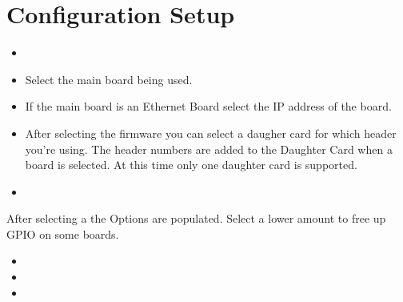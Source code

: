\documentclass[letterpaper,10pt,english,openany,oneside]{sphinxmanual}
\begin{document}
\section{Configuration Setup}
\label{\detokenize{machine:configuration-setup}}\begin{itemize}
\item {} 

\item {} 
 \sphinxhyphen{} Select the main board being used.

\item {} 
 \sphinxhyphen{} If the main board is an Ethernet Board select the IP
address of the board.

\item {} 
 \sphinxhyphen{} After selecting the firmware you can select a daugher
card for which header you’re using. The header numbers are added to
the Daughter Card when a board is selected. At this time only one
daughter card is supported.

\item {} 

\end{itemize}

After selecting a  the Options are populated. Select a lower
amount to free up GPIO on some boards.
\begin{itemize}
\item {} 

\item {} 

\item {} 

\end{itemize}
\end{document}
